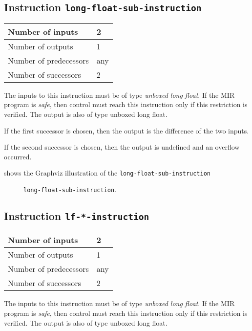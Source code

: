 \subsection{Instruction \texttt{long-float-sub-instruction}}
\label{mir-instruction-long-float-sub}

\begin{tabular}{|l|l|}
\hline
Number of inputs & 2\\
\hline
Number of outputs & 1\\
\hline
Number of predecessors & any\\
\hline
Number of successors & 2\\
\hline
\end{tabular}

The inputs to this instruction must be of type \emph{unboxed long
  float}.  If the MIR program is \emph{safe}, then control must reach
this instruction only if this restriction is verified.  The output is
also of type unboxed long float.

If the first successor is chosen, then the output is
the difference of the two inputs.  

If the second successor is chosen, then the output is undefined and an
overflow occurred. 

 shows the Graphviz illustration of the
\texttt{long-float-sub-instruction}

\begin{figure}
\begin{center}
\end{center}
\caption{\label{fig-long-float-sub-instruction}
\texttt{long-float-sub-instruction}.}
\end{figure}

\subsection{Instruction \texttt{lf-*-instruction}}
\label{mir-instruction-lf-*}

\begin{tabular}{|l|l|}
\hline
Number of inputs & 2\\
\hline
Number of outputs & 1\\
\hline
Number of predecessors & any\\
\hline
Number of successors & 2\\
\hline
\end{tabular}

The inputs to this instruction must be of type \emph{unboxed long
  float}.  If the MIR program is \emph{safe}, then control must reach
this instruction only if this restriction is verified.  The output is
also of type unboxed long float.


